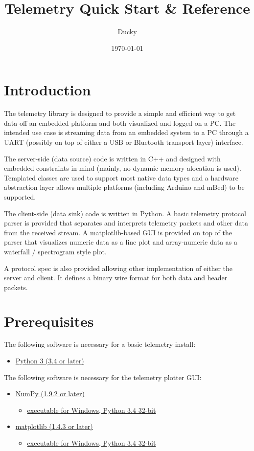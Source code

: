 \documentclass[11pt]{article}
\title{\textbf{Telemetry Quick Start \& Reference}}
\author{Ducky}
\date{\today}
\begin{document}
\maketitle

\section{Introduction}
The telemetry library is designed to provide a simple and efficient way to get data off an embedded platform and both visualized and logged on a PC. The intended use case is streaming data from an embedded system to a PC through a UART (possibly on top of either a USB or Bluetooth transport layer) interface.

The server-side (data source) code is written in C++ and designed with embedded constraints in mind (mainly, no dynamic memory alocation is used). Templated classes are used to support most native data types and a hardware abstraction layer allows multiple platforms (including Arduino and mBed) to be supported.

The client-side (data sink) code is written in Python. A basic telemetry protocol parser is provided that separates and interprets telemetry packets and other data from the received stream. A matplotlib-based GUI is provided on top of the parser that visualizes numeric data as a line plot and array-numeric data as a waterfall / spectrogram style plot.

A protocol spec is also provided allowing other implementation of either the server and client. It defines a binary wire format for both data and header packets.

\section{Prerequisites}
The following software is necessary for a basic telemetry install:
\begin{itemize}
  \item \href{https://www.python.org/downloads/}{Python 3 (3.4 or later)}
\end{itemize}

The following software is necessary for the telemetry plotter GUI:
\begin{itemize}
  \item \href{http://sourceforge.net/projects/numpy/files/NumPy/}{NumPy (1.9.2 or later)}
  \begin{itemize}
    \item \href{http://sourceforge.net/projects/numpy/files/NumPy/1.9.2/numpy-1.9.2-win32-superpack-python3.4.exe/download}{executable for Windows, Python 3.4 32-bit}
  \end{itemize}
  \item \href{http://matplotlib.org/downloads.html}{matplotlib (1.4.3 or later)}
  \begin{itemize}
    \item \href{http://sourceforge.net/projects/matplotlib/files/matplotlib/matplotlib-1.4.3/windows/matplotlib-1.4.3.win32-py3.4.exe/download}{executable for Windows, Python 3.4 32-bit}
  \end{itemize}
\end{itemize}
\end{document}
